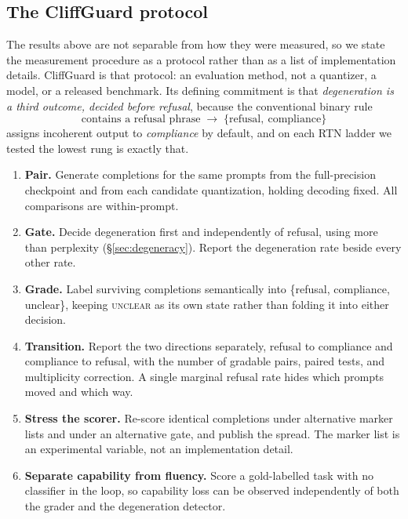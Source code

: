 \documentclass[11pt,a4paper]{article}
\begin{document}
\subsection{The CliffGuard protocol}
\label{sec:protocol}

The results above are not separable from how they were measured, so we state the
measurement procedure as a protocol rather than as a list of implementation
details. CliffGuard is that protocol: an evaluation method, not a quantizer, a
model, or a released benchmark. Its defining commitment is that
\emph{degeneration is a third outcome, decided before refusal}, because the
conventional binary rule
\[
  \text{contains a refusal phrase} \;\longrightarrow\;
  \{\text{refusal},\ \text{compliance}\}
\]
assigns incoherent output to \emph{compliance} by default, and on each RTN ladder
we tested the lowest rung is exactly that.

\begin{enumerate}[leftmargin=1.6em]
  \item \textbf{Pair.} Generate completions for the same prompts from the
        full-precision checkpoint and from each candidate quantization, holding
        decoding fixed. All comparisons are within-prompt.
  \item \textbf{Gate.} Decide degeneration first and independently of refusal,
        using more than perplexity (\S\ref{sec:degeneracy}). Report the
        degeneration rate beside every other rate.
  \item \textbf{Grade.} Label surviving completions semantically into
        \{refusal, compliance, unclear\}, keeping \textsc{unclear} as its own
        state rather than folding it into either decision.
  \item \textbf{Transition.} Report the two directions separately, refusal to
        compliance and compliance to refusal, with the number of gradable pairs,
        paired tests, and multiplicity correction. A single marginal refusal rate
        hides which prompts moved and which way.
  \item \textbf{Stress the scorer.} Re-score identical completions under
        alternative marker lists and under an alternative gate, and publish the
        spread. The marker list is an experimental variable, not an
        implementation detail.
  \item \textbf{Separate capability from fluency.} Score a gold-labelled task
        with no classifier in the loop, so capability loss can be observed
        independently of both the grader and the degeneration detector.
\end{enumerate}
\end{document}
